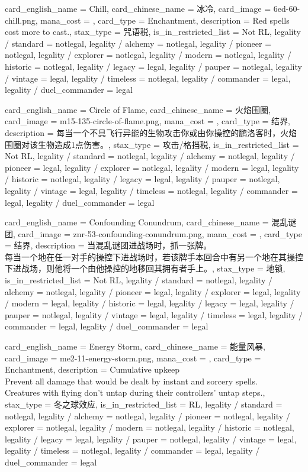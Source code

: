 \documentclass[lang = cn, color = black, 10pt]{AllThatStax}
\begin{document}
\card
{
	card_english_name = {Chill},
	card_chinese_name = {冰冷},
	card_image = 6ed-60-chill.png,
	mana_cost = ,
	card_type = Enchantment,
	description = {Red spells cost  more to cast.},
	stax_type = 咒语税,
	is_in_restricted_list = Not RL,
	legality / standard = notlegal,
	legality / alchemy = notlegal,
	legality / pioneer = notlegal,
	legality / explorer = notlegal,
	legality / modern = notlegal,
	legality / historic = notlegal,
	legality / legacy = legal,
	legality / pauper = notlegal,
	legality / vintage = legal,
	legality / timeless = notlegal,
	legality / commander = legal,
	legality / duel_commander = legal
}

\card
{
	card_english_name = {Circle of Flame},
	card_chinese_name = {火焰围圈},
	card_image = m15-135-circle-of-flame.png,
	mana_cost = ,
	card_type = 结界,
	description = {每当一个不具飞行异能的生物攻击你或由你操控的鹏洛客时，火焰围圈对该生物造成1点伤害。},
	stax_type = 攻击/格挡税,
	is_in_restricted_list = Not RL,
	legality / standard = notlegal,
	legality / alchemy = notlegal,
	legality / pioneer = legal,
	legality / explorer = notlegal,
	legality / modern = legal,
	legality / historic = notlegal,
	legality / legacy = legal,
	legality / pauper = notlegal,
	legality / vintage = legal,
	legality / timeless = notlegal,
	legality / commander = legal,
	legality / duel_commander = legal
}

\card
{
	card_english_name = {Confounding Conundrum},
	card_chinese_name = {混乱谜团},
	card_image = znr-53-confounding-conundrum.png,
	mana_cost = ,
	card_type = 结界,
	description = {当混乱谜团进战场时，抓一张牌。\\
		每当一个地在任一对手的操控下进战场时，若该牌手本回合中有另一个地在其操控下进战场，则他将一个由他操控的地移回其拥有者手上。},
	stax_type = 地锁,
	is_in_restricted_list = Not RL,
	legality / standard = notlegal,
	legality / alchemy = notlegal,
	legality / pioneer = legal,
	legality / explorer = legal,
	legality / modern = legal,
	legality / historic = legal,
	legality / legacy = legal,
	legality / pauper = notlegal,
	legality / vintage = legal,
	legality / timeless = legal,
	legality / commander = legal,
	legality / duel_commander = legal
}

\card
{
	card_english_name = {Energy Storm},
	card_chinese_name = {能量风暴},
	card_image = me2-11-energy-storm.png,
	mana_cost = ,
	card_type = Enchantment,
	description = {Cumulative upkeep  \\
		Prevent all damage that would be dealt by instant and sorcery spells.\\
		Creatures with flying don't untap during their controllers' untap steps.},
	stax_type = 冬之球效应,
	is_in_restricted_list = RL,
	legality / standard = notlegal,
	legality / alchemy = notlegal,
	legality / pioneer = notlegal,
	legality / explorer = notlegal,
	legality / modern = notlegal,
	legality / historic = notlegal,
	legality / legacy = legal,
	legality / pauper = notlegal,
	legality / vintage = legal,
	legality / timeless = notlegal,
	legality / commander = legal,
	legality / duel_commander = legal
}
\end{document}
